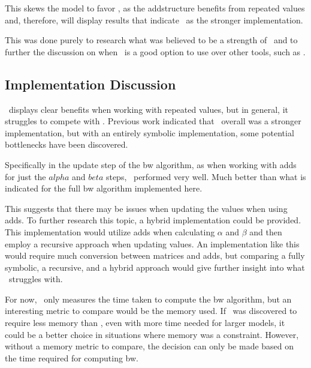This skews the model to favor \Cupaal, as the \gls{add}structure benefits from repeated values and, therefore, will display results that indicate \Cupaal\ as the stronger implementation.

This was done purely to research what was believed to be a strength of \Cupaal\ and to further the discussion on when \Cupaal\ is a good option to use over other tools, such as \Jajapy.


\subsection{Implementation Discussion} \label{subsec:implementation_discussion}
\Cupaal\ displays clear benefits when working with repeated values, but in general, it struggles to compete with \Jajapy.
Previous work indicated that \Cupaal\ overall was a stronger implementation, but with an entirely symbolic implementation, some potential bottlenecks have been discovered.

Specifically in the update step of the \gls{bw} algorithm, as when working with \glspl{add} for just the $alpha$ and $beta$ steps, \Cupaal\ performed very well.
Much better than what is indicated for the full \gls{bw} algorithm implemented here.

This suggests that there may be issues when updating the values when using \glspl{add}.
To further research this topic, a hybrid implementation could be provided.
This implementation would utilize \glspl{add} when calculating $\alpha$ and $\beta$ and then employ a recursive approach when updating values.
An implementation like this would require much conversion between matrices and \glspl{add}, but comparing a fully symbolic, a recursive, and a hybrid approach would give further insight into what \Cupaal\ struggles with.

For now, \Cupaal\ only measures the time taken to compute the \gls{bw} algorithm, but an interesting metric to compare would be the memory used.
If \Cupaal\ was discovered to require less memory than \Jajapy, even with more time needed for larger models, it could be a better choice in situations where memory was a constraint.
However, without a memory metric to compare, the decision can only be made based on the time required for computing \gls{bw}.

